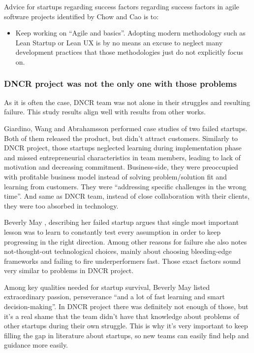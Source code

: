 \documentclass{article}
\begin{document}
Advice for startups regarding success factors regarding success factors in agile software projects identified by Chow and Cao is to:
\begin{itemize}
\item Keep working on ``Agile and basics''. Adopting modern methodology such as Lean Startup or Lean UX is by no means an excuse to neglect many development practices that those methodologies just do not explicitly focus on.
\end{itemize}

\subsubsection{DNCR project was not the only one with those problems}
As it is often the case, DNCR team was not alone in their struggles and resulting failure. This study results align well with results from other works.

Giardino, Wang and Abrahamsson \cite{giardino2014early} performed case studies of two failed startups. Both of them released the product, but didn't attract customers. Similarly to DNCR project, those startups neglected learning during implementation phase and missed entrepreneurial characteristics in team members, leading to lack of motivation and decreasing commitment. Business-side, they were preoccupied with profitable business model instead of solving problem/solution fit and learning from customers. They were ``addressing specific challenges in the wrong time''. And same as DNCR team, instead of close collaboration with their clients, they were too absorbed in technology.

Beverly May \cite{may2012applying}, describing her failed startup argues that single most important lesson was to learn to constantly test every assumption in order to keep progressing in the right direction. Among other reasons for failure she also notes not-thought-out technological choices, mainly about choosing bleeding-edge frameworks and failing to fire underperformers fast. Those exact factors sound very similar to problems in DNCR project.

Among key qualities needed for startup survival, Beverly May listed extraordinary passion, perseverance ``and a lot of fast learning and smart decision-making''. In DNCR project there was definitely not enough of those, but it's a real shame that the team didn't have that knowledge about problems of other startups during their own struggle. This is why it's very important to keep filling the gap in literature about startups, so new teams can easily find help and guidance more easily.
\end{document}
